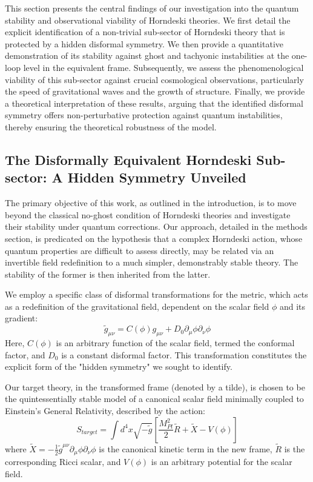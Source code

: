 \documentclass[twocolumn]{aastex631}
\begin{document}
\label{sec:results}

This section presents the central findings of our investigation into the quantum stability and observational viability of Horndeski theories. We first detail the explicit identification of a non-trivial sub-sector of Horndeski theory that is protected by a hidden disformal symmetry. We then provide a quantitative demonstration of its stability against ghost and tachyonic instabilities at the one-loop level in the equivalent frame. Subsequently, we assess the phenomenological viability of this sub-sector against crucial cosmological observations, particularly the speed of gravitational waves and the growth of structure. Finally, we provide a theoretical interpretation of these results, arguing that the identified disformal symmetry offers non-perturbative protection against quantum instabilities, thereby ensuring the theoretical robustness of the model.

\subsection{The Disformally Equivalent Horndeski Sub-sector: A Hidden Symmetry Unveiled}

The primary objective of this work, as outlined in the introduction, is to move beyond the classical no-ghost condition of Horndeski theories and investigate their stability under quantum corrections. Our approach, detailed in the methods section, is predicated on the hypothesis that a complex Horndeski action, whose quantum properties are difficult to assess directly, may be related via an invertible field redefinition to a much simpler, demonstrably stable theory. The stability of the former is then inherited from the latter.

We employ a specific class of disformal transformations for the metric, which acts as a redefinition of the gravitational field, dependent on the scalar field $\phi$ and its gradient:
\begin{equation}
\tilde{g}_{\mu\nu} = C(\phi) g_{\mu\nu} + D_0 \partial_\mu\phi \partial_\nu\phi
\end{equation}
Here, $C(\phi)$ is an arbitrary function of the scalar field, termed the conformal factor, and $D_0$ is a constant disformal factor. This transformation constitutes the explicit form of the "hidden symmetry" we sought to identify.

Our target theory, in the transformed frame (denoted by a tilde), is chosen to be the quintessentially stable model of a canonical scalar field minimally coupled to Einstein's General Relativity, described by the action:
\begin{equation}
S_{target} = \int d^4x \sqrt{-\tilde{g}} \left[ \frac{M_{Pl}^2}{2} \tilde{R} + \tilde{X} - V(\phi) \right]
\end{equation}
where $\tilde{X} = -\frac{1}{2} \tilde{g}^{\mu\nu} \partial_\mu \phi \partial_\nu \phi$ is the canonical kinetic term in the new frame, $\tilde{R}$ is the corresponding Ricci scalar, and $V(\phi)$ is an arbitrary potential for the scalar field.
\end{document}

